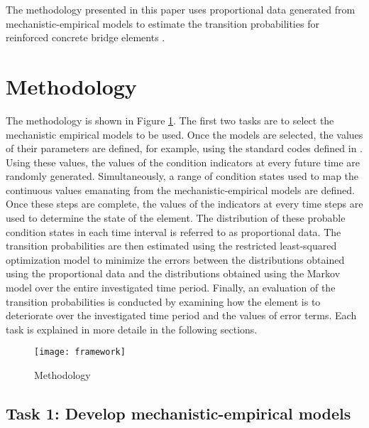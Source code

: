 \documentclass[Journal]{ascelike}
\begin{document}
The methodology presented in this paper uses proportional data generated
from mechanistic-empirical models to estimate the transition probabilities
for reinforced concrete bridge elements .

\section{Methodology}
\label{methodology}
The methodology is shown in Figure \ref{methodoframe}. The first
two tasks are to select the mechanistic empirical models to be used.
Once the models are selected, the values of their parameters are defined,
for example, using the standard codes defined in .
Using these values, the values of the condition indicators at every
future time are randomly generated. Simultaneously, a range of condition
states used to map the continuous values emanating from the mechanistic-empirical
models are defined. Once these steps are complete, the values of the
indicators at every time steps are used to determine the state of
the element. The distribution of these probable condition states in
each time interval is referred to as proportional data. The transition
probabilities are then estimated using the restricted least-squared
optimization model to minimize the errors between the distributions
obtained using the proportional data and the distributions obtained
using the Markov model over the entire investigated time period. Finally,
an evaluation of the transition probabilities is conducted by examining
how the element is to deteriorate over the investigated time period
and the values of error terms. Each task is explained in more detaile
in the following sections.

\begin{figure}[h!]
\centering \texttt{[image: framework]} \caption{Methodology}
\label{methodoframe} 
\end{figure}

\subsection{Task 1: Develop mechanistic-empirical models}
\end{document}
